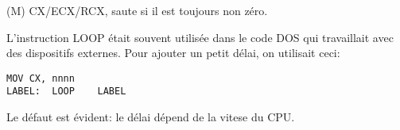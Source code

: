   \item[LOOP] (M)  CX/ECX/RCX,
  saute si il est toujours non zéro.

L'instruction LOOP était souvent utilisée dans le code DOS qui travaillait avec des
dispositifs externes.
Pour ajouter un petit délai, on utilisait ceci:

\begin{lstlisting}[style=customasmx86]
	MOV	CX, nnnn
LABEL:	LOOP	LABEL
\end{lstlisting}

Le défaut est évident: le délai dépend de la vitese du \ac{CPU}.

